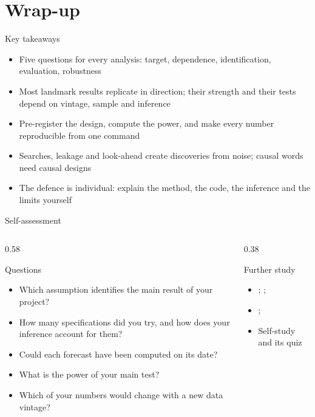 \section{Wrap-up}

\begin{frame}{Key takeaways}
\itemsize{\small}
\begin{itemize}
    \item Five questions for every analysis: target, dependence, identification, evaluation, robustness
    \item Most landmark results replicate in direction; their strength and their tests depend on vintage, sample and inference
    \item Pre-register the design, compute the power, and make every number reproducible from one command
    \item Searches, leakage and look-ahead create discoveries from noise; causal words need causal designs
    \item The defence is individual: explain the method, the code, the inference and the limits yourself
\end{itemize}
\end{frame}

\begin{frame}{Self-assessment}
\itemsize{\small}
\begin{columns}[T]
\begin{column}{0.58\textwidth}
\begin{block}{Questions}
\begin{itemize}
    \item Which assumption identifies the main result of your project?
    \item How many specifications did you try, and how does your inference account for them?
    \item Could each forecast have been computed on its date?
    \item What is the power of your main test?
    \item Which of your numbers would change with a new data vintage?
\end{itemize}
\end{block}
\end{column}
\begin{column}{0.38\textwidth}
\begin{block}{Further study}
\begin{itemize}
    \item {}; ; 
    \item {}; 
    \item Self-study  and its quiz
\end{itemize}
\end{block}
\end{column}
\end{columns}
\end{frame}


